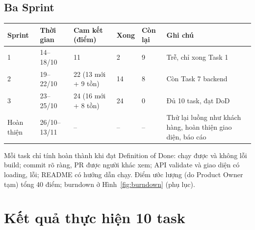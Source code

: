 \documentclass[a4paper]{article}
\begin{document}
\subsection{Ba Sprint}
\begin{center}
\small\everymath{}
\begin{tabular}{@{}p{1.4cm}p{2.0cm}p{3.0cm}p{1.2cm}p{1.5cm}p{3.2cm}@{}}
\toprule
\textbf{Sprint} & \textbf{Thời gian} & \textbf{Cam kết (điểm)} & \textbf{Xong} & \textbf{Còn lại} & \textbf{Ghi chú} \\ \midrule
1 & 14--18/10 & 11 & 2 & 9 & Trễ, chỉ xong Task 1 \\
2 & 19--22/10 & 22 (13 mới + 9 tồn) & 14 & 8 & Còn Task 7 backend \\
3 & 23--25/10 & 24 (16 mới + 8 tồn) & 24 & 0 & Đủ 10 task, đạt DoD \\
Hoàn thiện & 26/10--13/11 & -- & -- & -- & Thử lại luồng như khách hàng, hoàn thiện giao diện, báo cáo \\
\bottomrule
\end{tabular}
\end{center}
Mỗi task chỉ tính hoàn thành khi đạt Definition of Done: chạy được và không lỗi build; commit rõ ràng, PR được người khác xem; API validate và giao diện có loading, lỗi; README có hướng dẫn chạy. Điểm ước lượng (do Product Owner tạm) tổng 40 điểm; burndown ở Hình~\ref{fig:burndown} (phụ lục).

\section{Kết quả thực hiện 10 task}
\end{document}
